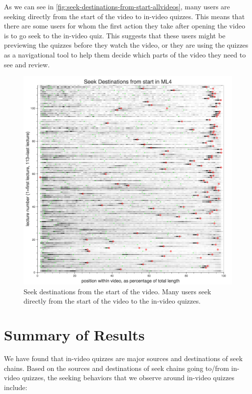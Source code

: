\documentclass{sigchi}
\begin{document}
As we can see in \autoref{fig:seek-destinations-from-start-allvideos}, many users are seeking directly from the start of the video to in-video quizzes. This means that there are some users for whom the first action they take after opening the video is to go seek to the in-video quiz. This suggests that these users might be previewing the quizzes before they watch the video, or they are using the quizzes as a navigational tool to help them decide which parts of the video they need to see and review.

\begin{figure}
\includegraphics[width=1.0\columnwidth]{seek-destinations-from-start-allvideos}
\caption{Seek destinations from the start of the video. Many users seek directly from the start of the video to the in-video quizzes.}
\label{fig:seek-destinations-from-start-allvideos}
\end{figure}

\section{Summary of Results}

We have found that in-video quizzes are major sources and destinations of seek chains. Based on the sources and destinations of seek chains going to/from in-video quizzes, the seeking behaviors that we observe around in-video quizzes include:
\end{document}
